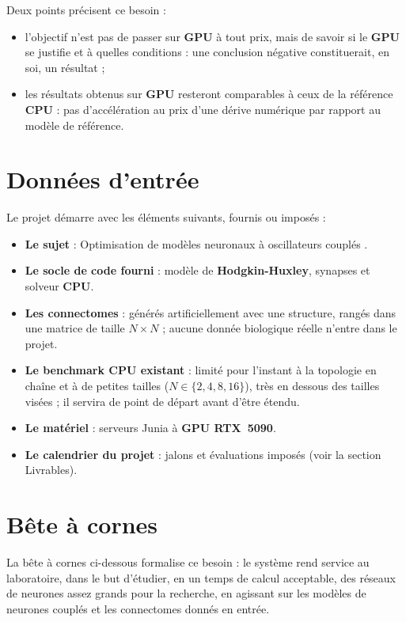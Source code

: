 \documentclass{report}
\begin{document}
Deux points précisent ce besoin :
\begin{itemize}
    \item l'objectif n'est pas de passer sur \textbf{GPU} à tout prix, mais de savoir si le \textbf{GPU} se justifie et à quelles conditions : une conclusion négative constituerait, en soi, un résultat ;
    \item les résultats obtenus sur \textbf{GPU} resteront comparables à ceux de la référence \textbf{CPU} : pas d'accélération au prix d'une dérive numérique par rapport au modèle de référence.
\end{itemize}

\section{Données d'entrée}

Le projet démarre avec les éléments suivants, fournis ou imposés :

\begin{itemize}
    \item \textbf{Le sujet} : \og Optimisation de modèles neuronaux à oscillateurs couplés \fg{}.
    \item \textbf{Le socle de code fourni} : modèle de \textbf{Hodgkin-Huxley}, synapses et solveur \textbf{CPU}.
    \item \textbf{Les connectomes} : générés artificiellement avec une structure, rangés dans une matrice de taille $N \times N$ ; aucune donnée biologique réelle n'entre dans le projet.
    \item \textbf{Le benchmark CPU existant} : limité pour l'instant à la topologie en chaîne et à de petites tailles ($N \in \{2, 4, 8, 16\}$), très en dessous des tailles visées ; il servira de point de départ avant d'être étendu.
    \item \textbf{Le matériel} : serveurs Junia à \textbf{GPU RTX~5090}.
    \item \textbf{Le calendrier du projet} : jalons et évaluations imposés (voir la section Livrables).
\end{itemize}

\section{Bête à cornes}

La bête à cornes ci-dessous formalise ce besoin : le système rend service au laboratoire, dans le but d'étudier, en un temps de calcul acceptable, des réseaux de neurones assez grands pour la recherche, en agissant sur les modèles de neurones couplés et les connectomes donnés en entrée.
\end{document}
